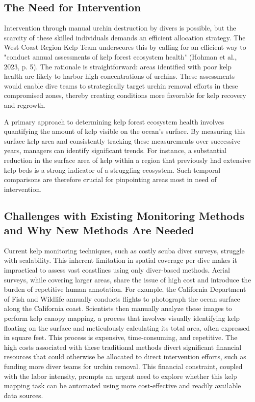 \documentclass{article}
\begin{document}
\subsection{The Need for Intervention} 

Intervention through manual urchin destruction by divers is possible, but the scarcity of these skilled individuals demands an efficient allocation strategy. The West Coast Region Kelp Team underscores this by calling for an efficient way to "conduct annual assessments of kelp forest ecosystem health" (Hohman et al., 2023, p. 5). The rationale is straightforward: areas identified with poor kelp health are likely to harbor high concentrations of urchins. These assessments would enable dive teams to strategically target urchin removal efforts in these compromised zones, thereby creating conditions more favorable for kelp recovery and regrowth. 

A primary approach to determining kelp forest ecosystem health involves quantifying the amount of kelp visible on the ocean's surface. By measuring this surface kelp area and consistently tracking these measurements over successive years, managers can identify significant trends. For instance, a substantial reduction in the surface area of kelp within a region that previously had extensive kelp beds is a strong indicator of a struggling ecosystem. Such temporal comparisons are therefore crucial for pinpointing areas most in need of intervention.

\subsection{Challenges with Existing Monitoring Methods and Why New Methods Are Needed} 

Current kelp monitoring techniques, such as costly scuba diver surveys, struggle with scalability. This inherent limitation in spatial coverage per dive makes it impractical to assess vast coastlines using only diver-based methods. Aerial surveys, while covering larger areas, share the issue of high cost and introduce the burden of repetitive human annotation. For example, the California Department of Fish and Wildlife annually conducts flights to photograph the ocean surface along the California coast. Scientists then manually analyze these images to perform kelp canopy mapping, a process that involves visually identifying kelp floating on the surface and meticulously calculating its total area, often expressed in square feet. This process is expensive, time-consuming, and repetitive. The high costs associated with these traditional methods divert significant financial resources that could otherwise be allocated to direct intervention efforts, such as funding more diver teams for urchin removal. This financial constraint, coupled with the labor intensity, prompts an urgent need to explore whether this kelp mapping task can be automated using more cost-effective and readily available data sources.
\end{document}
